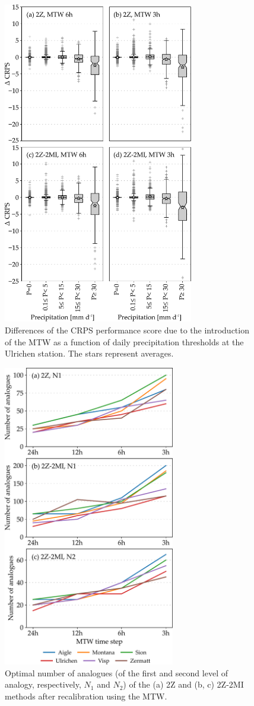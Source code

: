 \documentclass[hess, manuscript]{copernicus}
\begin{document}
	\begin{figure}[htb]
		\includegraphics[width=8.3cm]{fig10.pdf}
		\caption{Differences of the CRPS performance score due to the introduction of the MTW as a function of daily precipitation thresholds at the Ulrichen station. The stars represent averages.}
		\label{fig:changes_CRPS_precip_threshold}
	\end{figure}

	\begin{figure}[htb]
		\includegraphics[width=7.5cm]{fig12.pdf}
		\caption{Optimal number of analogues (of the first and second level of analogy, respectively, $N_{1}$ and $N_{2}$) of the (a) 2Z and (b, c) 2Z-2MI methods after recalibration using the MTW.}
		\label{fig:analog_nb}
	\end{figure}
	
\end{document}

